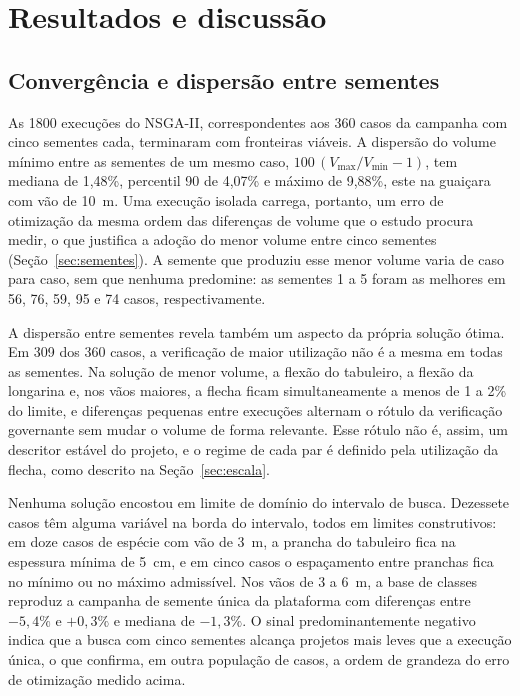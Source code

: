 \section{Resultados e discussão}\label{sec:results}

\subsection{Convergência e dispersão entre sementes}\label{sec:res_ruido}

As 1800 execuções do NSGA-II, correspondentes aos 360 casos da campanha com cinco sementes cada, terminaram com fronteiras viáveis. A dispersão do volume mínimo entre as sementes de um mesmo caso, $100\,(V_{\max}/V_{\min}-1)$, tem mediana de 1,48\%, percentil 90 de 4,07\% e máximo de 9,88\%, este na guaiçara com vão de 10~m. Uma execução isolada carrega, portanto, um erro de otimização da mesma ordem das diferenças de volume que o estudo procura medir, o que justifica a adoção do menor volume entre cinco sementes (Seção~\ref{sec:sementes}). A semente que produziu esse menor volume varia de caso para caso, sem que nenhuma predomine: as sementes 1 a 5 foram as melhores em 56, 76, 59, 95 e 74 casos, respectivamente.

A dispersão entre sementes revela também um aspecto da própria solução ótima. Em 309 dos 360 casos, a verificação de maior utilização não é a mesma em todas as sementes. Na solução de menor volume, a flexão do tabuleiro, a flexão da longarina e, nos vãos maiores, a flecha ficam simultaneamente a menos de 1 a 2\% do limite, e diferenças pequenas entre execuções alternam o rótulo da verificação governante sem mudar o volume de forma relevante. Esse rótulo não é, assim, um descritor estável do projeto, e o regime de cada par é definido pela utilização da flecha, como descrito na Seção~\ref{sec:escala}.

Nenhuma solução encostou em limite de domínio do intervalo de busca. Dezessete casos têm alguma variável na borda do intervalo, todos em limites construtivos: em doze casos de espécie com vão de 3~m, a prancha do tabuleiro fica na espessura mínima de 5~cm, e em cinco casos o espaçamento entre pranchas fica no mínimo ou no máximo admissível. Nos vãos de 3 a 6~m, a base de classes reproduz a campanha de semente única da plataforma com diferenças entre $-5{,}4\%$ e $+0{,}3\%$ e mediana de $-1{,}3\%$. O sinal predominantemente negativo indica que a busca com cinco sementes alcança projetos mais leves que a execução única, o que confirma, em outra população de casos, a ordem de grandeza do erro de otimização medido acima.

